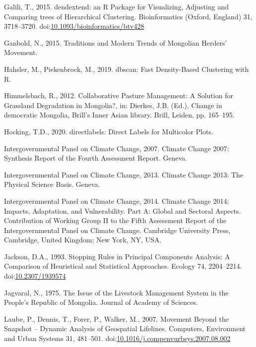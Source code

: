 \documentclass[]{elsarticle} %
\newlength{\cslhangindent}
\newenvironment{cslreferences}%
  {\setlength{\parindent}{0pt}%
  \everypar{\setlength{\hangindent}{\cslhangindent}}\ignorespaces}%
  {\par}
\begin{document}
\begin{cslreferences}
\leavevmode\hypertarget{ref-Galili.2015}{}%
Galili, T., 2015. dendextend: an R Package for Visualizing, Adjusting
and Comparing trees of Hierarchical Clustering. Bioinformatics (Oxford,
England) 31, 3718--3720.
doi:\href{https://doi.org/10.1093/bioinformatics/btv428}{10.1093/bioinformatics/btv428}

\leavevmode\hypertarget{ref-Ganbold.2015}{}%
Ganbold, N., 2015. Traditions and Modern Trends of Mongolian Herders'
Movement.

\leavevmode\hypertarget{ref-Hahsler.2019}{}%
Hahsler, M., Piekenbrock, M., 2019. dbscan: Fast Density-Based
Clustering with R.

\leavevmode\hypertarget{ref-Himmelsbach.2012}{}%
Himmelsbach, R., 2012. Collaborative Pasture Management: A Solution for
Grassland Degradation in Mongolia?, in: Dierkes, J.B. (Ed.), Change in
democratic Mongolia, Brill's Inner Asian library. Brill, Leiden, pp.
165--195.

\leavevmode\hypertarget{ref-Hocking.2020}{}%
Hocking, T.D., 2020. directlabels: Direct Labels for Multicolor Plots.

\leavevmode\hypertarget{ref-IntergovernmentalPanelonClimateChange.2007}{}%
Intergovernmental Panel on Climate Change, 2007. Climate Change 2007:
Synthesis Report of the Fourth Assessment Report. Geneva.

\leavevmode\hypertarget{ref-IntergovernmentalPanelonClimateChange.2013}{}%
Intergovernmental Panel on Climate Change, 2013. Climate Change 2013:
The Physical Science Basis. Geneva.

\leavevmode\hypertarget{ref-IPCC.2014}{}%
Intergovernmental Panel on Climate Change, 2014. Climate Change 2014:
Impacts, Adaptation, and Vulnerability. Part A: Global and Sectoral
Aspects. Contribution of Working Group II to the Fifth Assessment Report
of the Intergovernmental Panel on Climate Change. Cambridge University
Press, Cambridge, United Kingdom; New York, NY, USA.

\leavevmode\hypertarget{ref-Jackson.1993}{}%
Jackson, D.A., 1993. Stopping Rules in Principal Components Analysis: A
Comparison of Heuristical and Statistical Approaches. Ecology 74,
2204--2214. doi:\href{https://doi.org/10.2307/1939574}{10.2307/1939574}

\leavevmode\hypertarget{ref-Jagvaral.1975}{}%
Jagvaral, N., 1975. The Issue of the Livestock Management System in the
People's Republic of Mongolia. Journal of Academy of Sciences.

\leavevmode\hypertarget{ref-Laube.2007}{}%
Laube, P., Dennis, T., Forer, P., Walker, M., 2007. Movement Beyond the
Snapshot -- Dynamic Analysis of Geospatial Lifelines. Computers,
Environment and Urban Systems 31, 481--501.
doi:\href{https://doi.org/10.1016/j.compenvurbsys.2007.08.002}{10.1016/j.compenvurbsys.2007.08.002}


\end{cslreferences}
\end{document}
